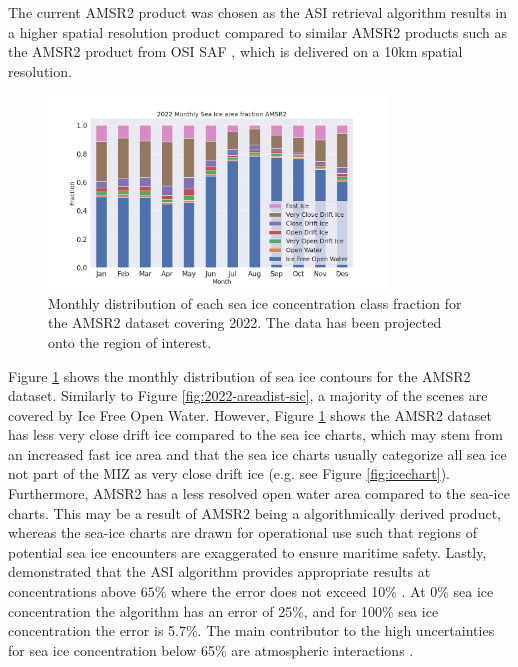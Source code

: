 \documentclass[../main/thesis.tex]{subfiles}
\begin{document}
The current AMSR2 product was chosen as the ASI retrieval algorithm \citep{Spreen2008} results in a higher spatial resolution product compared to similar AMSR2 products such as the AMSR2 product from OSI SAF \citep{Lavelle2016}, which is delivered on a 10km spatial resolution.

\begin{figure}
    \centering
    \includegraphics[width=0.8\textwidth]{2022-sic-distribution_amsr2}
    \caption{\label{fig:dist-amsr2}Monthly distribution of each sea ice concentration class fraction for the AMSR2 dataset covering 2022. The data has been projected onto the region of interest.}
\end{figure}

Figure \ref{fig:dist-amsr2} shows the monthly distribution of sea ice contours for the AMSR2 dataset. Similarly to Figure \ref{fig:2022-areadist-sic}, a majority of the scenes are covered by Ice Free Open Water. However, Figure \ref{fig:dist-amsr2} shows the AMSR2 dataset has less very close drift ice compared to the sea ice charts, which may stem from an increased fast ice area and that the sea ice charts usually categorize all sea ice not part of the MIZ as very close drift ice (e.g. see Figure \ref{fig:icechart}). Furthermore, AMSR2 has a less resolved open water area compared to the sea-ice charts. This may be a result of AMSR2 being a algorithmically derived product, whereas the sea-ice charts are drawn for operational use such that regions of potential sea ice encounters are exaggerated to ensure maritime safety. Lastly, \citet{Spreen2008} demonstrated that the ASI algorithm provides appropriate results at concentrations above $65\%$ where the error does not exceed 10\% \citep{Spreen2008}. At 0\% sea ice concentration the algorithm has an error of 25\%, and for 100\% sea ice concentration the error is 5.7\%. The main contributor to the high uncertainties for sea ice concentration below 65\% are atmospheric interactions \citep{Spreen2008}.
\end{document}
